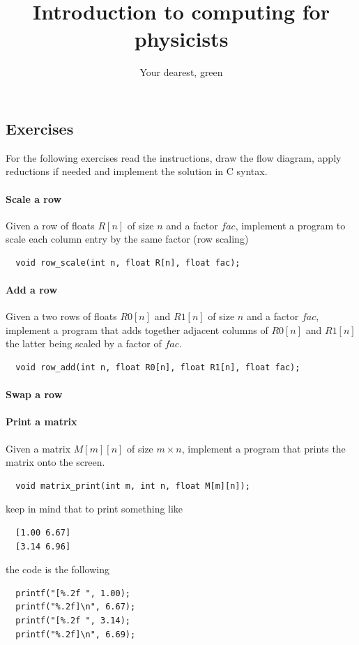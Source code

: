 \documentclass{article}
\title{Introduction to computing for physicists}
\author{Your dearest, green}
\begin{document}
\maketitle

\pagebreak



\pagebreak



\pagebreak

\subsection{Exercises}
For the following exercises read the instructions, draw the flow diagram,
apply reductions if needed and implement the solution in C syntax.

\paragraph{Scale a row}
Given a row of floats $R[n]$ of size $n$ and a factor $fac$, implement a program
to scale each column entry by the same factor (row scaling)
\begin{verbatim}
  void row_scale(int n, float R[n], float fac);
\end{verbatim}

\paragraph{Add a row}
Given a two rows of floats $R0[n]$ and $R1[n]$ of size $n$ and a factor $fac$,
implement a program that adds together adjacent columns of $R0[n]$ and $R1[n]$
the latter being scaled by a factor of $fac$.
\begin{verbatim}
  void row_add(int n, float R0[n], float R1[n], float fac);
\end{verbatim}

\paragraph{Swap a row}

\paragraph{Print a matrix}
Given a matrix $M[m][n]$ of size $m \times n$, implement a program that prints
the matrix onto the screen.
\begin{verbatim}
  void matrix_print(int m, int n, float M[m][n]);
\end{verbatim}
keep in mind that to print something like
\begin{verbatim}
  [1.00 6.67]
  [3.14 6.96]
\end{verbatim}
the code is the following
\begin{verbatim}
  printf("[%.2f ", 1.00);
  printf("%.2f]\n", 6.67);
  printf("[%.2f ", 3.14);
  printf("%.2f]\n", 6.69);
\end{verbatim}
\end{document}
